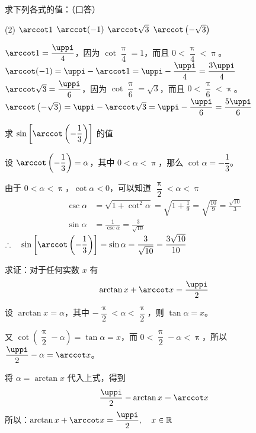 \begin{example}
  求下列各式的值：（口答）
  \begin{tasks}(2)
    \task $\arccot 1$
    \task $\arccot (- 1)$
    \task $\arccot \sqrt{3}$
    \task $\arccot \left(-\sqrt{3}\right)$
  \end{tasks}
\end{example}

\begin{solution}
\begin{tasks}
  \task $\arccot 1=\dfrac{\uppi}{4}$，因为 $\cot\dfrac{\uppi}{4}=1$，而且 $0<\dfrac{\uppi}{4}<\uppi$。
  \task $\arccot (- 1)=\uppi-\arccot 1=\uppi-\dfrac{\uppi}{4}=\dfrac{3\uppi}{4}$
  \task $\arccot \sqrt{3}=\dfrac{\uppi}{6}$，因为 $\cot\dfrac{\uppi}{6}=\sqrt{3}$，而且 $0<\dfrac{\uppi}{6}<\uppi$。
  \task $\arccot \left(-\sqrt{3}\right)=\uppi-\arccot\sqrt{3}=\uppi-\dfrac{\uppi}{6}=\dfrac{5\uppi}{6}$
\end{tasks}
\end{solution}

\begin{example}
  求 $\sin\left[\arccot\left(-\dfrac{1}{3}\right)\right]$ 的值
\end{example}

\begin{solution}
  设 $\arccot\left(-\dfrac{1}{3}\right)=\alpha$，其中 $0<\alpha<\uppi$，那么 $\cot\alpha=-\dfrac{1}{3}$。

  由于 $0<\alpha<\uppi$，$\cot\alpha<0$，可以知道 $\dfrac{\uppi}{2}<\alpha<\uppi$
\[\begin{split}
    \csc\alpha&=\sqrt{1+\cot^2\alpha}=\sqrt{1+\frac{1}{9}}=\sqrt{\frac{10}{9}}=\frac{\sqrt{10}}{3}\\
    \sin\alpha&=\frac{1}{\csc\alpha}=\frac{3}{\sqrt{10}}
\end{split}\]
$\therefore\quad \sin\left[\arccot\left(-\dfrac{1}{3}\right)\right]=\sin\alpha=\dfrac{3}{\sqrt{10}}=\dfrac{3\sqrt{10}}{10}$
\end{solution}

\begin{example}
    求证：对于任何实数 $x$ 有
\[\arctan x+\arccot x=\frac{\uppi}{2}\]
\end{example}

\begin{solution}
设 $\arctan x=\alpha$，其中 $-\dfrac{\uppi}{2}<\alpha<\dfrac{\uppi}{2}$，则 $\tan\alpha=x$。

又 $\cot\left(\dfrac{\uppi}{2}-\alpha\right)=\tan\alpha=x$，而 $0<\dfrac{\uppi}{2}-\alpha<\uppi$，所以 $\dfrac{\uppi}{2}-\alpha=\arccot x$。

将 $\alpha=\arctan x$ 代入上式，得到
\[\frac{\uppi}{2}-\arctan x=\arccot x\]
所以：$\arctan x+\arccot x=\dfrac{\uppi}{2},\quad x\in\mathbb{R}$
\end{solution}


